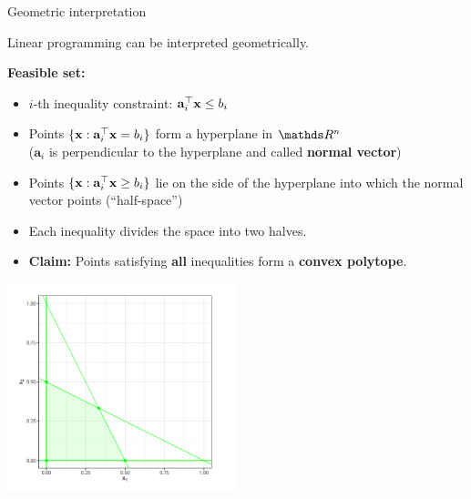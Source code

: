 \documentclass[11pt,compress,t,notes=noshow, xcolor=table]{beamer}
\begin{document}
\begin{vbframe}{Geometric interpretation}

Linear programming can be interpreted geometrically.

\lz

\textbf{Feasible set:}
\begin{itemize}
    \setlength{\itemsep}{1em}
    \item $i$-th inequality constraint: $\mathbf{a}_i^\top \mathbf{x} \le b_i$
    \item Points $\{ \mathbf{x}: \mathbf{a}_i^\top \mathbf{x} = b_i\}$ form a hyperplane in $\R^n$ \\
        ($\mathbf{a}_i$ is perpendicular to the hyperplane and called \textbf{normal vector})
    \item Points $\{\mathbf{x}: \mathbf{a}_i^\top \mathbf{x} \ge b_i\}$ lie on the side of the hyperplane into which the normal vector points (\enquote{half-space})









\framebreak

\item Each inequality divides the space into two halves.
\item \textbf{Claim:} Points satisfying \textbf{all} inequalities form a \textbf{convex polytope}.
\end{itemize}

\begin{center}
    \includegraphics[width=0.5\textwidth]{figure_man/linear-pro-example.png}
\end{center}



\end{vbframe}
\end{document}
